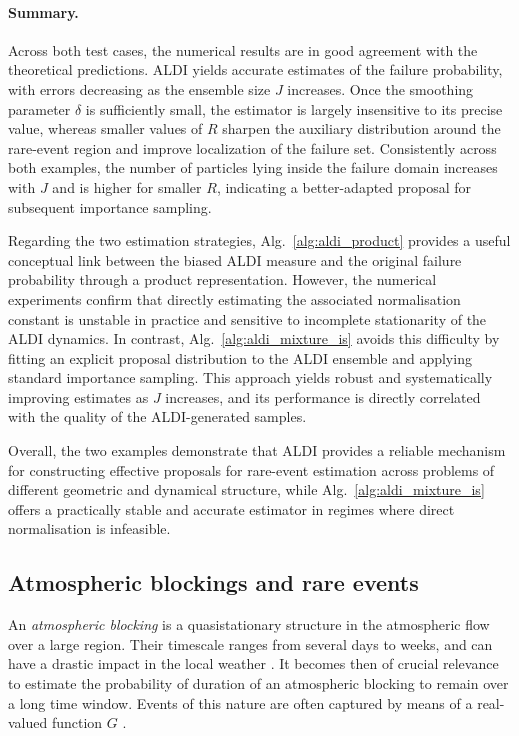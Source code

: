 \documentclass[a4paper]{article}
\numberwithin{equation}{section}
\begin{document}
\paragraph{Summary.}
Across both test cases, the numerical results are in good agreement with the
theoretical predictions. ALDI yields accurate estimates of the failure
probability, with errors decreasing as the ensemble size $J$ increases. Once
the smoothing parameter $\delta$ is sufficiently small, the estimator is largely
insensitive to its precise value, whereas smaller values of $R$ sharpen the
auxiliary distribution around the rare-event region and improve localization of
the failure set. Consistently across both examples, the number of particles
lying inside the failure domain increases with $J$ and is higher for smaller
$R$, indicating a better-adapted proposal for subsequent importance sampling.

Regarding the two estimation strategies, Alg.~\ref{alg:aldi_product} provides a useful
conceptual link between the biased ALDI measure and the original failure
probability through a product representation. However, the numerical
experiments confirm that directly estimating the associated normalisation
constant is unstable in practice and sensitive to incomplete stationarity of
the ALDI dynamics. In contrast, Alg.~\ref{alg:aldi_mixture_is} avoids this difficulty by fitting
an explicit proposal distribution to the ALDI ensemble and applying standard
importance sampling. This approach yields robust and systematically improving
estimates as $J$ increases, and its performance is directly correlated with the
quality of the ALDI-generated samples.

Overall, the two examples demonstrate that ALDI provides a reliable mechanism
for constructing effective proposals for rare-event estimation across problems
of different geometric and dynamical structure, while Alg.~\ref{alg:aldi_mixture_is} offers a
practically stable and accurate estimator in regimes where direct normalisation
is infeasible.



\subsection{Atmospheric blockings and rare events}
\label{SUBSEC:vortex}

An \textit{atmospheric blocking} is a quasistationary structure in the atmospheric flow over a large region. Their timescale ranges from several days to weeks, and can have a drastic impact in the local weather \cite{Kuhlbrodt00}. It becomes then of crucial relevance to estimate the probability of duration of an atmospheric blocking to remain over a long time window. Events of this nature are often captured by means of a real-valued function $G$  \cite{Ragone18,Ragone20}.
\end{document}
